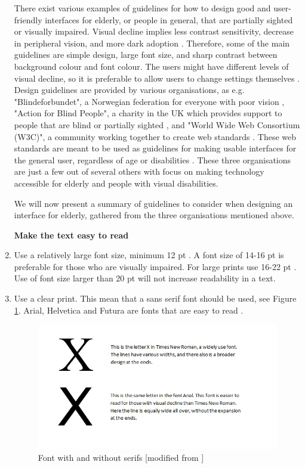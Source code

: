 \begin{enumerate}[{g}.1]
There exist various examples of guidelines for how to design good and user-friendly interfaces for elderly, or people in general, that are partially sighted or visually impaired. Visual decline implies less contrast sensitivity, decrease in peripheral vision, and more dark adoption \cite{ijsselsteijn2007digital}. Therefore, some of the main guidelines are simple design, large font size, and sharp contrast between background colour and font colour. The users might have different levels of visual decline, so it is preferable to allow users to change settings themselves \cite{blindeforbundetTekst} \cite{actionforblindpeopleTekst} \cite{w3cTekst}. Design guidelines are provided by various organisations, as e.g. "Blindeforbundet", a Norwegian federation for everyone with poor vision \cite{blindeforbundet}, "Action for Blind People", a charity in the UK which provides support to people that are blind or partially sighted \cite{actionforblindpeople}, and "World Wide Web Consortium (W3C)", a community working together to create web standards \cite{w3c}. These web standards are meant to be used as guidelines for making usable interfaces for the general user, regardless of age or disabilities \cite{w3cTekst}. These three organisations are just a few out of several others with focus on making technology accessible for elderly and people with visual disabilities. 

We will now present a summary of guidelines to consider when designing an interface for elderly, gathered from the three organisations mentioned above.


\textbf{Make the text easy to read}

\item Use a relatively large font size, minimum 12 pt \cite{blindeforbundetTekst} \cite{evengrounds}. A font size of 14-16 pt is preferable for those who are visually impaired. For large prints use 16-22 pt \cite{actionforblindpeopleTekst}. Use of font size larger than 20 pt will not increase readability in a text.     
\item Use a clear print. This mean that a sans serif font should be used, see Figure \ref{fig:fonts}. Arial, Helvetica and Futura are fonts that are easy to read \cite{actionforblindpeopleTekst}.
\begin{figure} [ht!]
\centering
\includegraphics[scale=0.75]{fontExample.jpg}
\caption[Fonts]{Font with and without serifs [modified from \cite{blindeforbundetTekst}]}
\label{fig:fonts}
\end{figure}


\end{enumerate}
